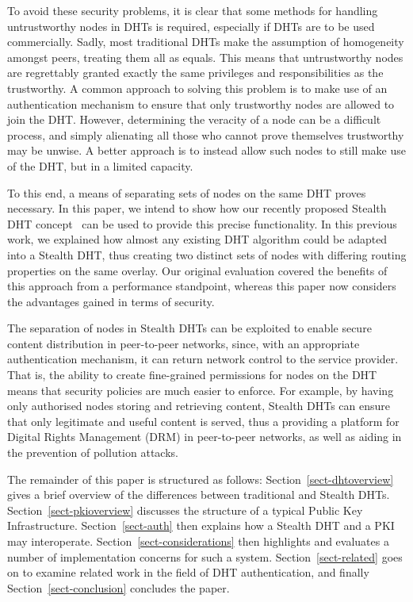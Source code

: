 \documentclass[pdftex,conference,10pt]{IEEEtran}
\begin{document}
To avoid these security problems, it is clear that some methods for
handling untrustworthy nodes in DHTs is required, especially if DHTs
are to be used commercially. Sadly, most traditional DHTs make the
assumption of homogeneity amongst peers, treating them all as equals.
This means that untrustworthy nodes are regrettably granted exactly the
same privileges and responsibilities as the trustworthy. A common
approach to solving this problem is to make use of an authentication
mechanism to ensure that only trustworthy nodes are allowed to join the
DHT. However, determining the veracity of a node can be a difficult
process, and simply alienating all those who cannot prove themselves
trustworthy may be unwise. A better approach is to instead allow such
nodes to still make use of the DHT, but in a limited capacity.

To this end, a means of separating sets of nodes on the same DHT proves
necessary. In this paper, we intend to show how our recently proposed
Stealth DHT concept~\cite{Brampton05Stealth} can be used to provide
this precise functionality. In this previous work, we explained how
almost any existing DHT algorithm could be adapted into a Stealth DHT,
thus creating two distinct sets of nodes with differing routing
properties on the same overlay. Our original evaluation covered the
benefits of this approach from a performance standpoint, whereas this
paper now considers the advantages gained in terms of security.

The separation of nodes in Stealth DHTs can be exploited to enable
secure content distribution in peer-to-peer networks, since, with an
appropriate authentication mechanism, it can return network control to
the service provider. That is, the ability to create fine-grained
permissions for nodes on the DHT means that security policies are much
easier to enforce. For example, by having only authorised nodes storing
and retrieving content, Stealth DHTs can ensure that only legitimate
and useful content is served, thus a providing a platform for Digital
Rights Management (DRM) in peer-to-peer networks, as well as aiding in
the prevention of pollution attacks.


The remainder of this paper is structured as follows:
Section~\ref{sect-dhtoverview} gives a brief overview of the
differences between traditional and Stealth DHTs.
Section~\ref{sect-pkioverview} discusses the structure of a typical
Public Key Infrastructure. Section~\ref{sect-auth} then explains how a
Stealth DHT and a PKI may interoperate.
Section~\ref{sect-considerations} then highlights and evaluates a
number of implementation concerns for such a system.
Section~\ref{sect-related} goes on to examine related work in the field
of DHT authentication, and finally Section~\ref{sect-conclusion}
concludes the paper.
\end{document}
